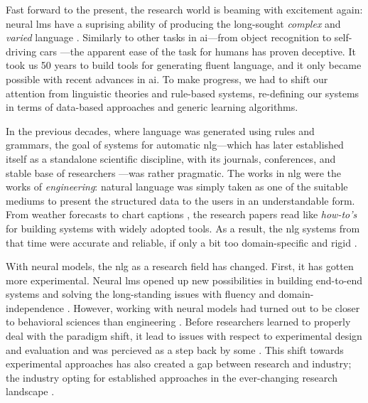 \documentclass[12pt,notitlepage,a4paper,openright]{report}
\begin{document}
Fast forward to the present, the research world is beaming with excitement again: neural \acp{lm} have a suprising ability of producing the long-sought \textit{complex} and \textit{varied} language \cite{radford2019language,brown2020language}. Similarly to other tasks in \ac{ai}---from object recognition \cite{papert1966summer} to self-driving cars \cite{autonomouscars}---the apparent ease of the task for humans has proven deceptive. It took us 50 years to build tools for generating fluent language, and it only became possible with recent advances in \ac{ai}. To make progress, we had to shift our attention from linguistic theories and rule-based systems, re-defining our systems in terms of data-based approaches and generic learning algorithms.

In the previous decades, where language was generated using rules and grammars, the goal of systems for automatic \ac{nlg}---which has later established itself as a standalone scientific discipline, with its journals, conferences, and stable base of researchers \cite{ACLanthologySIGGEN}---was rather pragmatic.
The works in \ac{nlg} were the works of \textit{engineering}: natural language was simply taken as one of the suitable mediums to present the structured data to the users in an understandable form. From weather forecasts \cite{belzAutomaticGenerationWeather2008} to chart captions \cite{demirSummarizingInformationGraphics2012}, the research papers read like \textit{how-to's} for building systems with widely adopted tools. As a result, the \ac{nlg} systems from that time were accurate and reliable, if only a bit too domain-specific and rigid \cite{reiterBuildingAppliedNatural1997,gattSurveyStateArt2018}.


With neural models, the  \ac{nlg} as a research field has changed. First, it has gotten more experimental. Neural \acp{lm} opened up new possibilities in building end-to-end systems and solving the long-standing issues with fluency and domain-independence \cite{ferreiraNeuralDatatotextGeneration2019,dusekEvaluatingStateoftheartEndtoEnd2020,sharmaInnovationsNeuralDatatotext2022}. However, working with neural models had turned out to be closer to behavioral sciences than engineering \cite{holtzmanGenerativeModelsComplex2023}. Before researchers learned to properly deal with the paradigm shift, it lead to issues with respect to experimental design and evaluation \cite{gehrmannRepairingCrackedFoundation2022} and was percieved as a step back by some \cite{reiter2020academic}. This shift towards experimental approaches has also created a gap between research and industry; the industry opting for established approaches in the ever-changing research landscape \cite{daleNaturalLanguageGeneration2020,daleNavigatingTextGeneration2023}.
\end{document}
